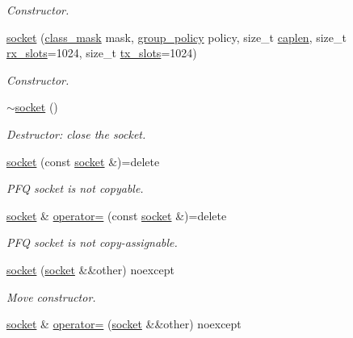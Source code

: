 \begin{DoxyCompactItemize}
\begin{DoxyCompactList}\small\item\em Constructor. \end{DoxyCompactList}\item 
\hyperlink{classpfq_1_1socket_abad0a4046d6af6c5b0b9b9759af6ff0a}{socket} (\hyperlink{namespacepfq_a96af1f5ed530eff563eb917516758fbb}{class\+\_\+mask} mask, \hyperlink{namespacepfq_ac41249c8510558905b01fa4d866a38d7}{group\+\_\+policy} policy, size\+\_\+t \hyperlink{classpfq_1_1socket_ab68dbba5ef01041b9c96758c4a9f0a6c}{caplen}, size\+\_\+t \hyperlink{classpfq_1_1socket_a5cf700fc12d67b91df3d669ac4aa737a}{rx\+\_\+slots}=1024, size\+\_\+t \hyperlink{classpfq_1_1socket_a019d15a072c043d6a1333ca0c836da4c}{tx\+\_\+slots}=1024)
\begin{DoxyCompactList}\small\item\em Constructor. \end{DoxyCompactList}\item 
\hyperlink{classpfq_1_1socket_a08fbdcc1736de36d205282ce20ffbaa3}{$\sim$socket} ()
\begin{DoxyCompactList}\small\item\em Destructor\+: close the socket. \end{DoxyCompactList}\item 
\hyperlink{classpfq_1_1socket_a517b6fdd622cdb2a64f2960176296f8d}{socket} (const \hyperlink{classpfq_1_1socket}{socket} \&)=delete
\begin{DoxyCompactList}\small\item\em P\+F\+Q socket is not copyable. \end{DoxyCompactList}\item 
\hyperlink{classpfq_1_1socket}{socket} \& \hyperlink{classpfq_1_1socket_a3cfd9674358a2ffd8b37e76d73b8a654}{operator=} (const \hyperlink{classpfq_1_1socket}{socket} \&)=delete
\begin{DoxyCompactList}\small\item\em P\+F\+Q socket is not copy-\/assignable. \end{DoxyCompactList}\item 
\hyperlink{classpfq_1_1socket_a1a60820551f1601beb54649d9ae48fa2}{socket} (\hyperlink{classpfq_1_1socket}{socket} \&\&other) noexcept
\begin{DoxyCompactList}\small\item\em Move constructor. \end{DoxyCompactList}\item 
\hyperlink{classpfq_1_1socket}{socket} \& \hyperlink{classpfq_1_1socket_a8022eafa68b84a840292ebcfc4d1ba7a}{operator=} (\hyperlink{classpfq_1_1socket}{socket} \&\&other) noexcept

\end{DoxyCompactItemize}
